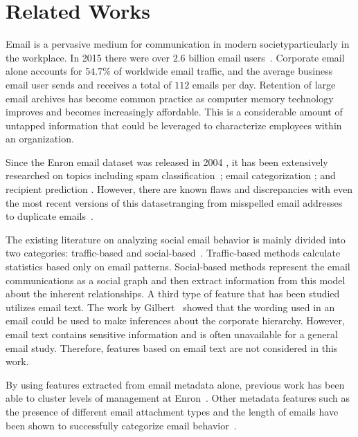 \documentclass[10pt,twocolumn,conference]{IEEEtran}
\begin{document}
\section{Related Works} \label{Related Works}

Email is a pervasive medium for communication in modern society\textemdash{}particularly in the workplace.
In 2015 there were over $2.6$ billion email users~\cite{radicati_emails_2015}.
Corporate email alone accounts for $54.7\%$ of worldwide email traffic, and the average business email user sends and receives a total of $112$ emails per day.
Retention of large email archives has become common practice as computer memory technology improves and becomes increasingly affordable.
This is a considerable amount of untapped information that could be leveraged to characterize employees within an organization.

Since the Enron email dataset was released in 2004 \cite{klimt2004introducing}, it has been extensively researched on topics including spam classification~\cite{martin2005analyzing}; email categorization \cite{he2014novel}; and recipient prediction \cite{sofershtein2015predicting}.
However, there are known flaws and discrepancies with even the most recent versions of this dataset\textemdash{}ranging from misspelled email addresses~\cite{nordbo2014data} to duplicate emails~\cite{waterman2014big}.

The existing literature on analyzing social email behavior is mainly divided into two categories: traffic-based and social-based~\cite{tang2014email}.
Traffic-based methods calculate statistics based only on email patterns.
Social-based methods represent the email communications as a social graph and then extract information from this model about the inherent relationships.
A third type of feature that has been studied utilizes email text.
The work by Gilbert~\cite{gilbert2012phrases} showed that the wording used in an email could be used to make inferences about the corporate hierarchy.
However, email text contains sensitive information and is often unavailable for a general email study.
Therefore, features based on email text are not considered in this work.

By using features extracted from email metadata alone, previous work has been able to cluster levels of management at Enron~\cite{yelupula2008social}.
Other metadata features such as the presence of different email attachment types and the length of emails have been shown to successfully categorize email behavior~\cite{martin2005analyzing}.
\end{document}
